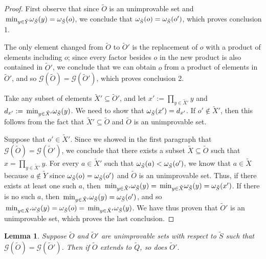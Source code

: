 \documentclass[twocolumn,showpacs,preprintnumbers,amsmath,amssymb,nofootinbib,pra,floatfix]{revtex4-1}
\newtheorem{lemma}{Lemma}
\newcommand{\set}{\tilde}
\newcommand{\genfun}{\mathcal{G}}
\begin{document}
\begin{proof}
First observe that since $\set O$ is an unimprovable set and $\min_{y\in\set Y}\om_{\set S}(y)=\om_{\set S}(o)$, we conclude that $\om_{\set S}(o)=\om_{\set S}(o')$, which proves conclusion 1.

The only element changed from $\set O$ to $\set O'$ is the replacement of $o$ with a product of elements including $o$;  since every factor besides $o$ in the new product is also contained in $\set O'$, we conclude that we can obtain $o$ from a product of elements in $\set O'$, and so $\genfun(\set O)=\genfun(\set O')$, which proves conclusion 2.

Take any subset of elements $\set X'\subseteq\set O'$, and let $x' := \prod_{y\in \set X'} y$ and $d_{x'}:=\min_{y\in\set X'}\om_{\set S}(y)$.  We need to show that $\om_{\set S}(x') = d_{x'}$.  If $o'\notin\set X'$, then this follows from the fact that $\set X'\subseteq\set O$ and $\set O$ is an unimprovable set.

Suppose that $o'\in\set X'$. Since we showed in the first paragraph that $\genfun(\set O)=\genfun(\set O')$, we conclude that there exists a subset $\set X\subseteq\set O$ such that $x=\prod_{y\in \set X'}y$.  For every $a\in\set X'$ such that $\om_{\set S}(a)<\om_{\set S}(o')$, we know that $a\in\set X$ because $a\notin\set Y$ since $\om_{\set S}(o)=\om_{\set S}(o')$ and $\set O$ is an unimprovable set.  Thus, if there exists at least one such $a$, then $\min_{y\in\set X'}\om_{\set S}(y)=\min_{y\in\set X}\om_{\set S}(y)=\om_{\set S}(x')$.  If there is no such $a$, then $\min_{y\in\set X'}\om_{\set S}(y)=\om_{\set S}(o')$, and so $\min_{y\in\set X'}\om_{\set S}(y)=\om_{\set S}(o)=\min_{y\in\set X'}\om_{\set S}(y)$.  We have thus proven that $\set O'$ is an unimprovable set, which proves the last conclusion.

\end{proof}
\begin{lemma}
\label{recombining elements preserves extension}
Suppose $\set O$ and $\set O'$ are unimprovable sets with respect to $\set S$ such that $\genfun(\set O)=\genfun(\set O')$.  Then if $\set O$ extends to $\set Q$, so does $\set O'$.
\end{lemma}
\end{document}
